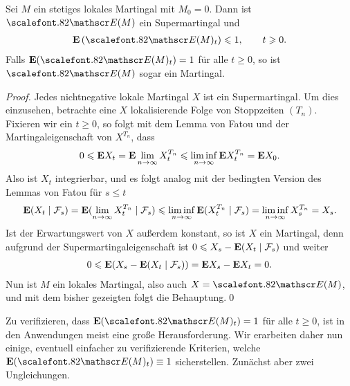 \begin{lem}
\label{lem:3.2}
Sei $M$ ein stetiges lokales Martingal mit $M_0=0$. Dann ist $\Ep(M)$ ein
Supermartingal und 
\begin{align*}
\E \left(\Ep(M)_t \right) \le 1 ,\qquad t\ge 0.
\end{align*}
Falls $\E(\Ep(M)_t)=1$ für alle $t \ge 0$, so ist $\Ep(M)$ sogar ein
Martingal.\fish
\end{lem}
\begin{proof}
Jedes nichtnegative lokale Martingal $X$ ist ein Supermartingal. Um dies
einzusehen, betrachte eine $X$ lokalisierende Folge von Stoppzeiten $(T_n)$.
Fixieren wir ein $t\ge 0$, so folgt mit dem Lemma von Fatou und der
Martingaleigenschaft von $X^{T_n}$, dass
\begin{align*}
0\leqslant \mathbf{E} X_t = \mathbf{E} \lim\limits_{n\to \infty} X_{t}^{T_n}
\leqslant \liminf_{n\to\infty} \mathbf{E} X_t^{T_n} = \mathbf{E} X_0.
\end{align*}
Also ist $X_t$ integrierbar, und es folgt analog mit der bedingten Version des
Lemmas von Fatou für $s\le t$
\begin{align*}
\mathbf{E}(X_t\mid \mathcal{F}_s) = \mathbf{E}(\lim\limits_{n\to \infty} X_t^{T_n}\mid \mathcal{F}_s)
\leqslant
\liminf\limits_{n\to \infty} 
\mathbf{E}( X_t^{T_n}\mid \mathcal{F}_s)
=
\liminf\limits_{n\to \infty} 
X_s^{T_n} = X_s.
\end{align*}
Ist der Erwartungswert von $X$ außerdem konstant, so ist $X$ ein Martingal, denn
aufgrund der Supermartingaleigenschaft ist $0 \leqslant X_s - \mathbf{E}(X_t \mid \mathcal{F}_s)$ und
weiter
\begin{align*}
0 \leqslant \mathbf{E} (X_s - \mathbf{E}(X_t \mid \mathcal{F}_s)) = \mathbf{E} X_s - \mathbf{E} X_t = 0.
\end{align*}
Nun ist $M$ ein lokales Martingal, also auch $X=\Ep(M)$, und mit dem bisher
gezeigten folgt die Behauptung.\qed
\end{proof} 

Zu verifizieren, dass $\E(\Ep(M)_t)=1$ für alle $t\ge 0$, ist in den Anwendungen
meist eine große Herausforderung. Wir erarbeiten daher nun einige, eventuell
einfacher zu verifizierende Kriterien,  welche $\E(\Ep(M)_t)\equiv 1$
sicherstellen. Zunächst aber zwei Ungleichungen.

